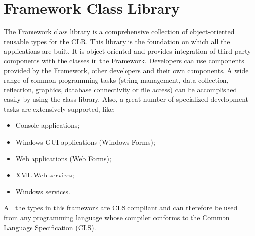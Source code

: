 \section{Framework Class Library}
\label{sec:fcl}
The \dotNET Framework class library is a comprehensive collection of object-oriented reusable types for the CLR. 
This library is the foundation on which all the \dotNET applications are built.
It is object oriented and provides integration of third-party components with the classes in the \dotNET Framework.
Developers can use components provided by the \dotNET Framework, other developers and their own components.
%
%
A wide range of common programming tasks (\eg string management, data collection, reflection, graphics, database connectivity or file access) can be accomplished easily by using the class library.
Also, a great number of specialized development tasks are extensively supported, like:
\begin{itemize}[noitemsep]
  \item Console applications;
  \item Windows GUI applications (Windows Forms);
  \item Web applications (Web Forms);
  \item XML Web services;
  \item Windows services.
\end{itemize}
All the types in this framework are CLS compliant and can therefore be used from any programming language whose compiler conforms to the Common Language Specification (CLS).